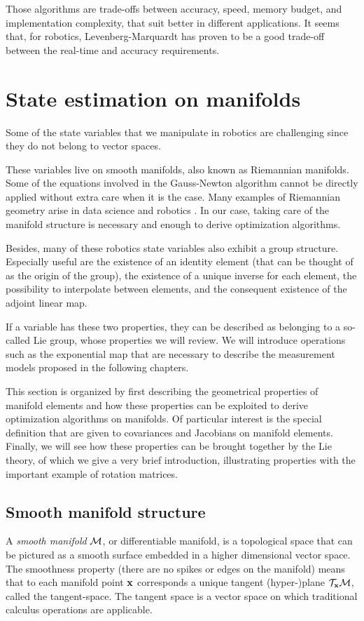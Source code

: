 Those algorithms are trade-offs between accuracy, speed, memory budget, and implementation complexity, 
that suit better in different applications. It seems that, for robotics, Levenberg-Marquardt has proven to be a good trade-off between the real-time and
accuracy requirements. 







\section{State estimation on manifolds}
Some of the state variables that we manipulate in robotics are challenging since they do not belong to vector spaces. 

These variables live on smooth manifolds, also known as Riemannian manifolds. 
Some of the equations involved in the Gauss-Newton algorithm cannot be directly applied without extra care when it is the case.
Many examples of Riemannian geometry arise in data science and robotics \cite{miolane2020geomstats}. 
In our case, taking care of the manifold structure is necessary and enough to derive optimization algorithms.

Besides, many of these robotics state variables also exhibit a group structure.
Especially useful are the existence of an identity element (that can be thought of as the origin of the group), 
the existence of a unique inverse for each element, the possibility to interpolate between elements, and
the consequent existence of the adjoint linear map.

If a variable has these two properties, they can be described as belonging to a so-called Lie group, whose properties we will review.
We will introduce operations such as the exponential map that are necessary to describe the measurement models proposed in the following chapters.

This section is organized by first describing the geometrical properties of manifold elements and how these properties
can be exploited to derive optimization algorithms on manifolds. Of particular interest is the special definition that are given to 
covariances and Jacobians on manifold elements. Finally, we will see how these properties can be brought together by the Lie theory, of which
we give a very brief introduction, illustrating properties with the important example of rotation matrices.



\subsection{Smooth manifold structure}
\label{sec:manifold_structure}
A \textit{smooth manifold} $\mathcal{M}$, or differentiable manifold, is a topological space that can be pictured as a smooth surface embedded in a higher dimensional vector space.
The smoothness property (there are no spikes or edges on the manifold) means that to each manifold point ${\bf x}$ corresponds a unique tangent \mbox{(hyper-)plane} $\mathcal{T}_{{\bf x}}\mathcal{M}$, called the tangent-space. The tangent space is a vector space on which traditional calculus operations are applicable. 

